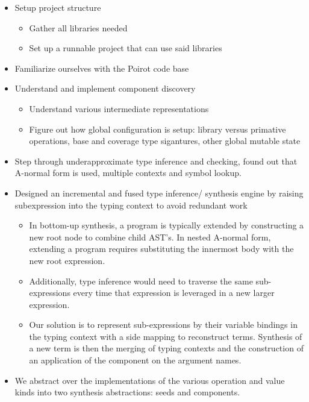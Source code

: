 \documentclass[review, sigplan]{acmart}
\begin{document}
\begin{itemize}
    \item Setup project structure
          \begin{itemize}
              \item Gather all libraries needed
              \item Set up a runnable project that can use said libraries
          \end{itemize}
    \item Familiarize ourselves with the Poirot code base
    \item Understand and implement component discovery
          \begin{itemize}
              \item Understand various intermediate representations
              \item Figure out how global configuration is setup: library versus primative  operations, base and coverage type sigantures, other global mutable state
          \end{itemize}
    \item Step through underapproximate type inference and checking, found out that A-normal form is used, multiple contexts and symbol lookup.
    \item Designed an incremental and fused type inference/ synthesis engine by raising subexpression into the typing context to avoid redundant work
          \begin{itemize}
              \item In bottom-up synthesis, a program is typically extended by constructing a new root node to combine child AST's. In nested A-normal form, extending a program requires substituting the innermost body with the new root expression.
              \item Additionally, type inference would need to traverse the same sub-expressions every time that expression is leveraged in a new larger expression.
              \item Our solution is to represent sub-expressions by their variable bindings in the typing context with a side mapping to reconstruct terms. Synthesis of a new term is then the merging of typing contexts and the construction of an application of the component on the argument names.
          \end{itemize}
    \item We abstract over the implementations of the various operation and value kinds into two synthesis abstractions: seeds and components.

\end{itemize}
\end{document}
